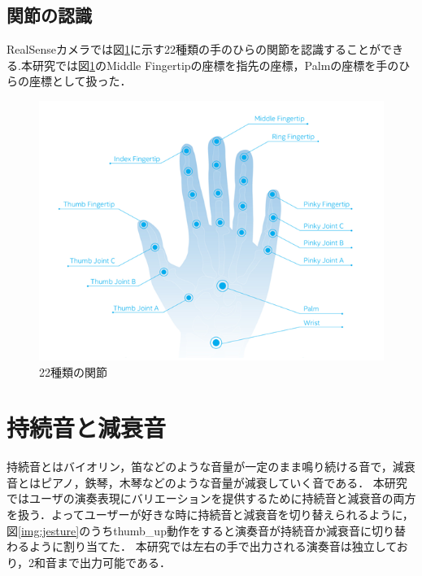 \subsection{関節の認識}
RealSenseカメラでは図\ref{img:handlabels}に示す22種類の手のひらの関節を認識することができる.本研究では図\ref{img:handlabels}のMiddle Fingertipの座標を指先の座標，Palmの座標を手のひらの座標として扱った．
\begin{figure}[t]
	\begin{center}
		\includegraphics[width=1\linewidth]{assets/img/hand_labels.png}
		\caption{22種類の関節\cite{hand_labels}}
		\label{img:handlabels}
	\end{center}
\end{figure}

\section{持続音と減衰音}
持続音とはバイオリン，笛などのような音量が一定のまま鳴り続ける音で，減衰音とはピアノ，鉄琴，木琴などのような音量が減衰していく音である．
本研究ではユーザの演奏表現にバリエーションを提供するために持続音と減衰音の両方を扱う．よってユーザーが好きな時に持続音と減衰音を切り替えられるように，図\ref{img:jesture}のうちthumb\_up動作をすると演奏音が持続音か減衰音に切り替わるように割り当てた．
本研究では左右の手で出力される演奏音は独立しており，2和音まで出力可能である．


